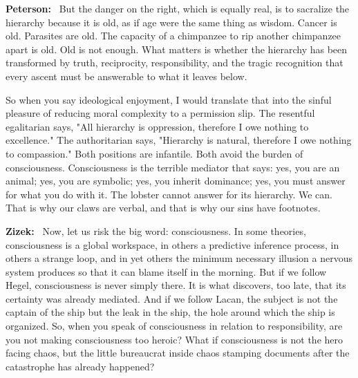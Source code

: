 \documentclass[a4paper,11pt]{article}
\newenvironment{question}{\par\noindent\color{ALIUSRed}\textbf{Zizek:}\ }{\par}
\newenvironment{answer}{\par\noindent\color{black}\textbf{Peterson:}\ }{\par}
\begin{document}
\begin{answer}
But the danger on the right, which is equally real, is to sacralize the hierarchy because it is old, as if age were the same thing as wisdom. Cancer is old. Parasites are old. The capacity of a chimpanzee to rip another chimpanzee apart is old. Old is not enough. What matters is whether the hierarchy has been transformed by truth, reciprocity, responsibility, and the tragic recognition that every ascent must be answerable to what it leaves below.

So when you say ideological enjoyment, I would translate that into the sinful pleasure of reducing moral complexity to a permission slip. The resentful egalitarian says, "All hierarchy is oppression, therefore I owe nothing to excellence." The authoritarian says, "Hierarchy is natural, therefore I owe nothing to compassion." Both positions are infantile. Both avoid the burden of consciousness. Consciousness is the terrible mediator that says: yes, you are an animal; yes, you are symbolic; yes, you inherit dominance; yes, you must answer for what you do with it. The lobster cannot answer for its hierarchy. We can. That is why our claws are verbal, and that is why our sins have footnotes.
\end{answer}

\begin{question}
Now, let us risk the big word: consciousness. In some theories, consciousness is a global workspace, in others a predictive inference process, in others a strange loop, and in yet others the minimum necessary illusion a nervous system produces so that it can blame itself in the morning. But if we follow Hegel, consciousness is never simply there. It is what discovers, too late, that its certainty was already mediated. And if we follow Lacan, the subject is not the captain of the ship but the leak in the ship, the hole around which the ship is organized. So, when you speak of consciousness in relation to responsibility, are you not making consciousness too heroic? What if consciousness is not the hero facing chaos, but the little bureaucrat inside chaos stamping documents after the catastrophe has already happened?
\end{question}
\end{document}

